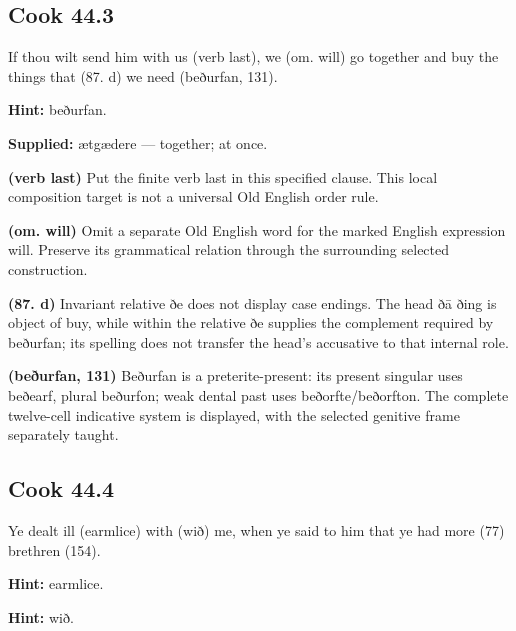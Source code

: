 \par\begin{minipage}{\linewidth}\raggedright
\subsection*{Cook 44.3}

If thou wilt send him with us (verb last), we (om. will) go together and buy the things that (87. d) we need (beðurfan, 131).

\textbf{Hint:} beðurfan.

\textbf{Supplied:} ætgædere — together; at once.

\textbf{(verb last)} Put the finite verb last in this specified clause. This local composition target is not a universal Old English order rule.

\textbf{(om. will)} Omit a separate Old English word for the marked English expression will. Preserve its grammatical relation through the surrounding selected construction.

\textbf{(87. d)} Invariant relative ðe does not display case endings. The head ðā ðing is object of buy, while within the relative ðe supplies the complement required by beðurfan; its spelling does not transfer the head’s accusative to that internal role.

\textbf{(beðurfan, 131)} Beðurfan is a preterite-present: its present singular uses beðearf, plural beðurfon; weak dental past uses beðorfte/\allowbreak{}beðorfton. The complete twelve-cell indicative system is displayed, with the selected genitive frame separately taught.

\end{minipage}\par\addvspace{4pt}

\par\begin{minipage}{\linewidth}\raggedright
\subsection*{Cook 44.4}

Ye dealt ill (earmlice) with (wið) me, when ye said to him that ye had more (77) brethren (154).

\textbf{Hint:} earmlice.

\textbf{Hint:} wið.

\end{minipage}\par\addvspace{4pt}

